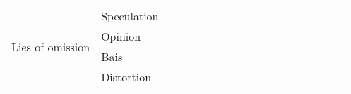 \begin{table*}[!h]
{\begin{tabular}{l|l|l|l|l|l|l|l|l|l|l|l|l|l|l|l|l|l}
  \multirow{5}{*}{Lies of omission}     & Speculation             & \multicolumn{1}{l|}{} & \multicolumn{1}{l|}{\multirow{5}{*}{}} & \multicolumn{1}{l|}{} & \multicolumn{1}{l|}{\multirow{5}{*}{}} & \multicolumn{1}{l|}{} & \multicolumn{1}{l|}{\multirow{5}{*}{}} & \multicolumn{1}{l|}{} & \multirow{5}{*}{} & \multicolumn{1}{l|}{} & \multicolumn{1}{l|}{\multirow{5}{*}{}} & \multicolumn{1}{l|}{} & \multicolumn{1}{l|}{\multirow{5}{*}{}} & \multicolumn{1}{l|}{} & \multicolumn{1}{l|}{\multirow{5}{*}{}} & \multicolumn{1}{l|}{} & \multirow{5}{*}{} \\ \cline{2-3} \cline{5-5} \cline{7-7} \cline{9-9} \cline{11-11} \cline{13-13} \cline{15-15} \cline{17-17}
                                                        & Opinion                 & \multicolumn{1}{l|}{} & \multicolumn{1}{l|}{}                  & \multicolumn{1}{l|}{} & \multicolumn{1}{l|}{}                  & \multicolumn{1}{l|}{} & \multicolumn{1}{l|}{}                  & \multicolumn{1}{l|}{} &                   & \multicolumn{1}{l|}{} & \multicolumn{1}{l|}{}                  & \multicolumn{1}{l|}{} & \multicolumn{1}{l|}{}                  & \multicolumn{1}{l|}{} & \multicolumn{1}{l|}{}                  & \multicolumn{1}{l|}{} &                   \\ \cline{2-3} \cline{5-5} \cline{7-7} \cline{9-9} \cline{11-11} \cline{13-13} \cline{15-15} \cline{17-17}
                                                        & Bais                    & \multicolumn{1}{l|}{} & \multicolumn{1}{l|}{}                  & \multicolumn{1}{l|}{} & \multicolumn{1}{l|}{}                  & \multicolumn{1}{l|}{} & \multicolumn{1}{l|}{}                  & \multicolumn{1}{l|}{} &                   & \multicolumn{1}{l|}{} & \multicolumn{1}{l|}{}                  & \multicolumn{1}{l|}{} & \multicolumn{1}{l|}{}                  & \multicolumn{1}{l|}{} & \multicolumn{1}{l|}{}                  & \multicolumn{1}{l|}{} &                   \\ \cline{2-3} \cline{5-5} \cline{7-7} \cline{9-9} \cline{11-11} \cline{13-13} \cline{15-15} \cline{17-17}
                                                        & Distortion              & \multicolumn{1}{l|}{} & \multicolumn{1}{l|}{}                  & \multicolumn{1}{l|}{} & \multicolumn{1}{l|}{}                  & \multicolumn{1}{l|}{} & \multicolumn{1}{l|}{}                  & \multicolumn{1}{l|}{} &                   & \multicolumn{1}{l|}{} & \multicolumn{1}{l|}{}                  & \multicolumn{1}{l|}{} & \multicolumn{1}{l|}{}                  & \multicolumn{1}{l|}{} & \multicolumn{1}{l|}{}                  & \multicolumn{1}{l|}{} &                   \\ \cline{2-3} \cline{5-5} \cline{7-7} \cline{9-9} \cline{11-11} \cline{13-13} \cline{15-15} \cline{17-17}

\end{tabular}}
\end{table*}
